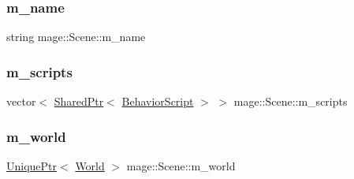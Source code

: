 \hypertarget{classmage_1_1_scene_a6cc8cb08b1853c4e3063b33a94e8fb47}{}\label{classmage_1_1_scene_a6cc8cb08b1853c4e3063b33a94e8fb47} 
\subsubsection{\texorpdfstring{m\+\_\+name}{m\_name}}
{\footnotesize\ttfamily string mage\+::\+Scene\+::m\+\_\+name\hspace{0.3cm}{\ttfamily [private]}}

\hypertarget{classmage_1_1_scene_a84548bf6978f8955ce5892cb23536a4e}{}\label{classmage_1_1_scene_a84548bf6978f8955ce5892cb23536a4e} 
\subsubsection{\texorpdfstring{m\+\_\+scripts}{m\_scripts}}
{\footnotesize\ttfamily vector$<$ \hyperlink{namespacemage_a1e01ae66713838a7a67d30e44c67703e}{Shared\+Ptr}$<$ \hyperlink{classmage_1_1_behavior_script}{Behavior\+Script} $>$ $>$ mage\+::\+Scene\+::m\+\_\+scripts\hspace{0.3cm}{\ttfamily [private]}}

\hypertarget{classmage_1_1_scene_a0d06149d881166497bf75ae2288bf960}{}\label{classmage_1_1_scene_a0d06149d881166497bf75ae2288bf960} 
\subsubsection{\texorpdfstring{m\+\_\+world}{m\_world}}
{\footnotesize\ttfamily \hyperlink{namespacemage_a8c307fbcc33bce9b7f2aa4c26c3b95cf}{Unique\+Ptr}$<$ \hyperlink{classmage_1_1_world}{World} $>$ mage\+::\+Scene\+::m\+\_\+world\hspace{0.3cm}{\ttfamily [private]}}

